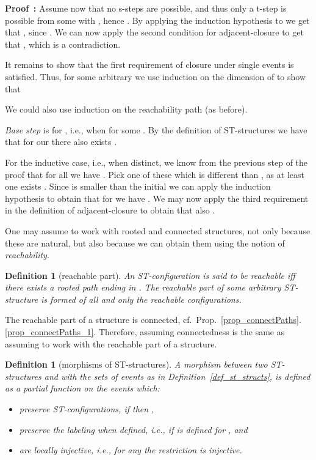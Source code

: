 \documentclass[submission,copyright,creativecommons]{eptcs}
\newtheorem{definition}[theorem]{Definition}
\newenvironment{proof}[1][\!\!\,]{\vspace{1ex}\noindent\textbf{Proof #1: }}{\hfill\vspace{2ex}}
\newcounter{case}
\begin{document}
\begin{proof}
Assume now that no s-steps are possible, and thus only a t-step is possible from some  with , hence . By applying the induction hypothesis to  we get that , since . We can now apply the second condition for adjacent-closure to get that , which is a contradiction.

It remains to show that the first requirement of closure under single events is satisfied.
Thus, for some arbitrary  we use induction on the dimension of  to show that 

We could also use induction on the reachability path (as before).

\textit{Base step} is for , i.e., when  for some . By the definition of ST-structures we have that for our  there also exists .

For the inductive case, i.e., when  distinct, we know from the previous step of the proof that for all  we have . Pick one of these which is different than , as at least one exists . Since  is smaller than the initial  we can apply the induction hypothesis to obtain that for  we have . We may now apply the third requirement in the definition of adjacent-closure to obtain that also .
\end{proof}



One may assume to work with rooted and connected structures, not only because these are natural, but also because we can obtain them using the notion of \textit{reachability}.



\begin{definition}[reachable part]\label{def_reachability}
An ST-configuration  is said to be \emph{reachable} iff there exists a rooted path ending in . The \emph{reachable part} of some arbitrary ST-structure is formed of all and only the reachable configurations. 
\end{definition}

The reachable part of a structure is connected, cf.~Prop.~\ref{prop_connectPaths}.\ref{prop_connectPaths_1}. Therefore, assuming connectedness is the same as assuming to work with the reachable part of a structure. 



\begin{definition}[morphisms of ST-structures]\label{def_morphism_ST}
A \emph{morphism}  between two ST-structures  and  with the sets of events as in Definition~\ref{def_st_structs}, is defined as a partial function on the events  which: 
\begin{itemize}
\item 
preserve ST-configurations, if  then ,
\item 
preserve the labeling when defined, i.e.,  if  is defined for , and 
\item
are locally injective, i.e., for any  the restriction  is injective.
\end{itemize}
\end{definition}
\end{document}
